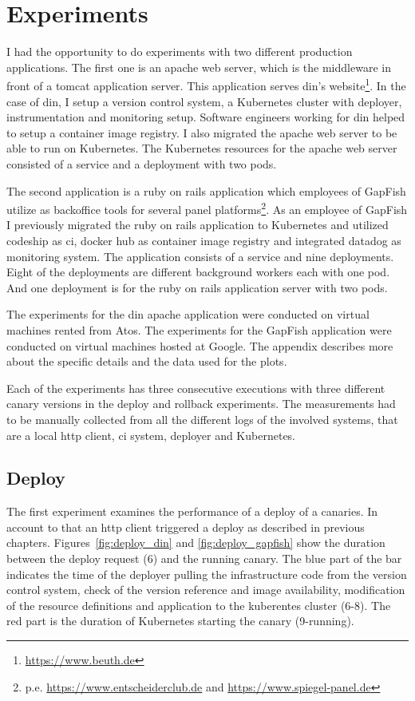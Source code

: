 \section{Experiments}

I had the opportunity to do experiments with two different production applications. The
first one is an apache web server, which is the middleware in front of a tomcat application
server. This application serves \gls{din}'s
website\footnote{\url{https://www.beuth.de}}. In the case of \gls{din}, I setup a version
control system, a Kubernetes cluster with deployer, instrumentation and monitoring
setup. Software engineers working for \gls{din} helped to setup a container image
registry. I also migrated the apache web server to be able to run on Kubernetes. The
Kubernetes resources for the apache web server consisted of a service and a deployment with
two pods.

The second application is a ruby on rails application which employees of GapFish utilize
as backoffice tools for several panel
platforms\footnote{p.e. \url{https://www.entscheiderclub.de} and
  \url{https://www.spiegel-panel.de}}. As an employee of GapFish I previously migrated the
ruby on rails application to Kubernetes and utilized codeship as \gls{ci}, docker hub as
container image registry and integrated datadog as monitoring system. The application
consists of a service and nine deployments. Eight of the deployments are different
background workers each with one pod. And one deployment is for the ruby on rails
application server with two pods.

The experiments for the \gls{din} apache application were conducted on virtual machines
rented from Atos. The experiments for the GapFish application were conducted on virtual
machines hosted at Google. The appendix describes more about the specific details and the
data used for the plots.

Each of the experiments has three consecutive executions with three different canary
versions in the deploy and rollback experiments. The measurements had to be manually
collected from all the different logs of the involved systems, that are a local http
client, \gls{ci} system, deployer and Kubernetes.

\subsection{Deploy}

The first experiment examines the performance of a deploy of a canaries. In account to
that an http client triggered a deploy as described in previous
chapters. Figures~\ref{fig:deploy_din} and \ref{fig:deploy_gapfish} show the duration
between the deploy request (6) and the running canary. The blue part of the bar indicates
the time of the deployer pulling the infrastructure code from the version control system,
check of the version reference and image availability, modification of the resource
definitions and application to the kuberentes cluster (6-8). The red part is the duration
of Kubernetes starting the canary (9-running).

